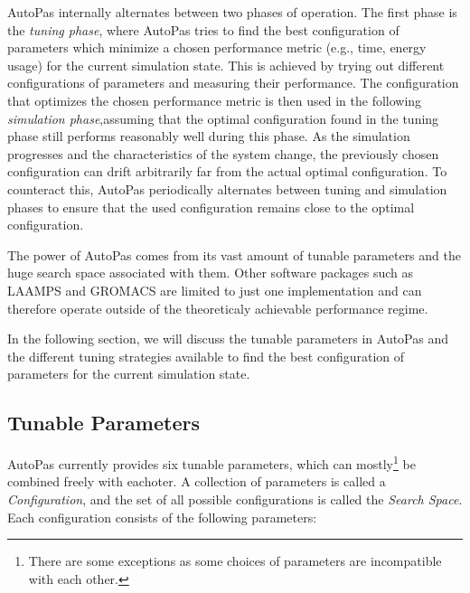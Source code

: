 AutoPas internally alternates between two phases of operation. The first phase is the \emph{tuning phase}, where AutoPas tries to find the best configuration of parameters which minimize a chosen performance metric (e.g., time, energy usage) for the current simulation state. This is achieved by trying out different configurations of parameters and measuring their performance. The configuration that optimizes the chosen performance metric is then used in the following \emph{simulation phase},assuming that the optimal configuration found in the tuning phase still performs reasonably well during this phase.
As the simulation progresses and the characteristics of the system change, the previously chosen configuration can drift arbitrarily far from the actual optimal configuration. To counteract this, AutoPas periodically alternates between tuning and simulation phases to ensure that the used configuration remains close to the optimal configuration.

The power of AutoPas comes from its vast amount of tunable parameters and the huge search space associated with them. Other software packages such as LAAMPS and GROMACS are limited to just one implementation and can therefore operate outside of the theoreticaly achievable performance regime.

In the following section, we will discuss the tunable parameters in AutoPas and the different tuning strategies available to find the best configuration of parameters for the current simulation state.

\subsection{Tunable Parameters}

AutoPas currently provides six tunable parameters, which can mostly\footnote{There are some exceptions as some choices of parameters are incompatible with each other.} be combined freely with eachoter. A collection of parameters is called a \emph{Configuration}, and the set of all possible configurations is called the \emph{Search Space}. Each configuration consists of the following parameters:

